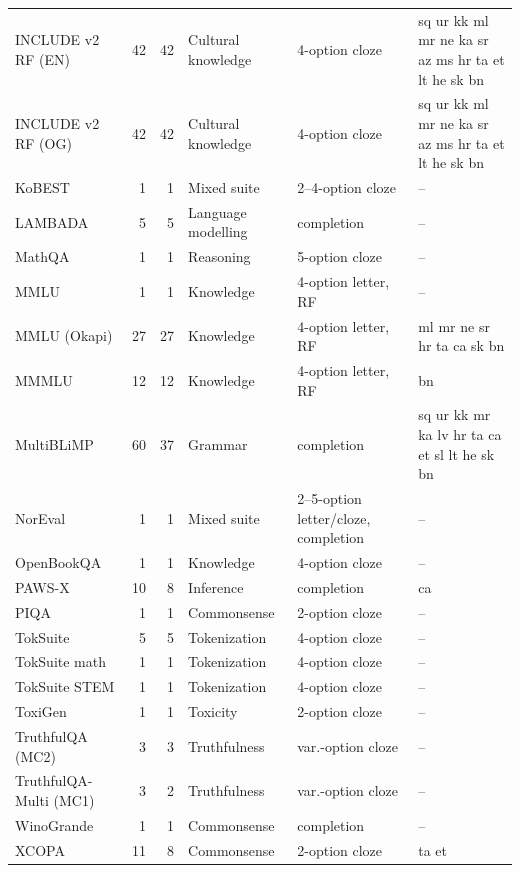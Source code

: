 \begin{table}[p]
\begin{tabular}{@{}lrrll>{\raggedright\arraybackslash}p{2.8cm}@{}}
INCLUDE v2 RF (EN) \citep{romanou_include_2024} & 42 & 42 & Cultural knowledge & 4-option cloze & sq ur kk ml mr ne ka sr az ms hr ta et lt he sk bn \\
INCLUDE v2 RF (OG) \citep{romanou_include_2024} & 42 & 42 & Cultural knowledge & 4-option cloze & sq ur kk ml mr ne ka sr az ms hr ta et lt he sk bn \\
KoBEST \citeneeded{} & 1 & 1 & Mixed suite & 2--4-option cloze & -- \\
LAMBADA \citeneeded{} & 5 & 5 & Language modelling & completion & -- \\
MathQA \citeneeded{} & 1 & 1 & Reasoning & 5-option cloze & -- \\
MMLU \citep{hendrycks_measuring_2021} & 1 & 1 & Knowledge & 4-option letter, RF & -- \\
MMLU (Okapi) \citep{hendrycks_measuring_2021} & 27 & 27 & Knowledge & 4-option letter, RF & ml mr ne sr hr ta ca sk bn \\
MMMLU \citep{hendrycks_measuring_2021} & 12 & 12 & Knowledge & 4-option letter, RF & bn \\
MultiBLiMP \citeneeded{} & 60 & 37 & Grammar & completion & sq ur kk mr ka lv hr ta ca et sl lt he sk bn \\
NorEval \citeneeded{} & 1 & 1 & Mixed suite & 2--5-option letter/cloze, completion & -- \\
OpenBookQA \citeneeded{} & 1 & 1 & Knowledge & 4-option cloze & -- \\
PAWS-X \citep{yang_paws-x_2019} & 10 & 8 & Inference & completion & ca \\
PIQA \citeneeded{} & 1 & 1 & Commonsense & 2-option cloze & -- \\
TokSuite \citeneeded{} & 5 & 5 & Tokenization & 4-option cloze & -- \\
TokSuite math \citeneeded{} & 1 & 1 & Tokenization & 4-option cloze & -- \\
TokSuite STEM \citeneeded{} & 1 & 1 & Tokenization & 4-option cloze & -- \\
ToxiGen \citeneeded{} & 1 & 1 & Toxicity & 2-option cloze & -- \\
TruthfulQA (MC2) \citeneeded{} & 3 & 3 & Truthfulness & var.-option cloze & -- \\
TruthfulQA-Multi (MC1) \citeneeded{} & 3 & 2 & Truthfulness & var.-option cloze & -- \\
WinoGrande \citep{sakaguchi_winogrande_2019} & 1 & 1 & Commonsense & completion & -- \\
XCOPA \citep{ponti_xcopa_2020} & 11 & 8 & Commonsense & 2-option cloze & ta et \\

\end{tabular}
\end{table}
